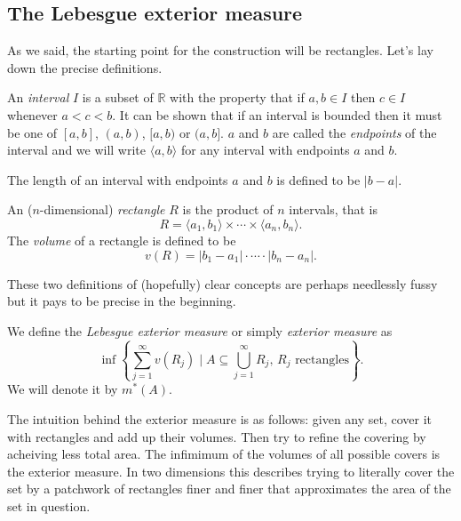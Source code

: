 \documentclass[12pt,oneside]{book}
\numberwithin{table}{section}
\numberwithin{equation}{section}
\numberwithin{figure}{section}
\newcommand{\R}{\mathbb{R}}
\newcommand{\abs}[1]{\lvert #1 \rvert}
\newcommand{\ext}[1]{m^* \! \left( #1 \right)}
\begin{document}
\subsection{The Lebesgue exterior measure}
As we said, the starting point for the construction will be rectangles. Let's lay down the precise definitions.
\begin{definition}[Interval]
	An \emph{interval} \( I \) is a subset of \( \R \) with the property that if \( a, b \in I \) then \( c \in I \) whenever \( a < c < b \). It can be shown that if an interval is bounded then it must be one of \( [a,b] \), \( (a,b) \), \( [a,b) \) or \( (a,b] \). \( a \) and \( b \) are called the \emph{endpoints} of the interval and we will write \( \langle a,b \rangle \) for any interval with endpoints \( a \) and \( b \).

The length of an interval with endpoints \( a \) and \( b \) is defined to be \( \abs{b - a} \).
\end{definition}

\begin{definition}[Rectangle]
	An (\( n \)-dimensional) \emph{rectangle} \( R \) is the product of \( n \) intervals, that is
	\begin{equation*}
		R = \langle a_1, b_1 \rangle \times \cdots \times \langle a_n, b_n \rangle.
	\end{equation*}
	The \emph{volume} of a rectangle is defined to be
	\begin{equation*}
		v(R) = \abs{b_1 - a_1} \cdot \cdots \cdot \abs{b_n - a_n}.
	\end{equation*}
\end{definition}
These two definitions of (hopefully) clear concepts are perhaps needlessly fussy but it pays to be precise in the beginning.

\begin{definition}
	We define the \emph{Lebesgue exterior measure} or simply \emph{exterior measure} as
	\begin{equation*}
		\inf \left\{ \sum_{j = 1}^{\infty} v(R_j) \mid A \subseteq \bigcup_{j = 1}^{\infty}R_j \text{, }R_j\text{ rectangles} \right\}.
	\end{equation*}
	We will denote it by \( \ext{A} \).
\end{definition}
The intuition behind the exterior measure is as follows: given any set, cover it with rectangles and add up their volumes. Then try to refine the covering by acheiving less total area. The infimimum of the volumes of all possible covers is the exterior measure. In two dimensions this describes trying to literally cover the set by a patchwork of rectangles finer and finer that approximates the area of the set in question.
\end{document}
